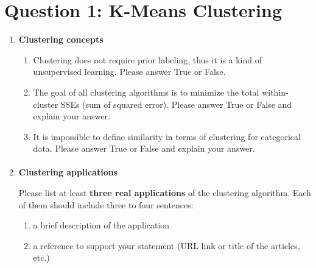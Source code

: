 \documentclass[12pt]{article}
\begin{document}
\homework
    {}
    {}
    {}
\vspace{-16pt}

\section*{Question 1: K-Means Clustering }

\begin{enumerate}
    \item \textbf{Clustering concepts} 
    \par
    \begin{enumerate}
        \item Clustering does not require prior labeling, thus it is a kind of unsupervised learning. Please answer True or False. \\
        \item The goal of all clustering algorithms is to minimize the total within-cluster SSEs (sum of squared error). Please answer True or False and explain your answer. \\
        \item It is impossible to define similarity in terms of clustering for categorical data. Please answer True or False and explain your answer. \\
    \paragraph{}
    \end{enumerate}
    \item \textbf{Clustering applications} 
    \par
    Please list at least \textbf{three real applications} of the clustering algorithm. Each of them should include three to four sentences:
    \begin{enumerate}
        \item a brief description of the application
        \item a reference to support your statement (URL link or title of the articles, etc.)
    \end{enumerate}


\end{enumerate}
\end{document}
